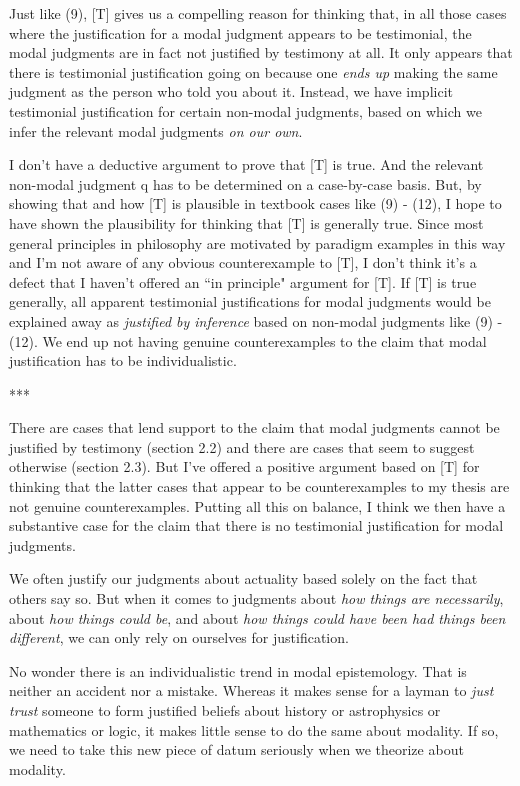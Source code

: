 \documentclass[a4paper,12pt]{article}
\begin{document}
Just like (9), [T] gives us a compelling reason for thinking that, in all those cases where the justification for a modal judgment appears to be testimonial, the modal judgments are in fact not justified by testimony at all. It only appears that there is testimonial justification going on because one \emph{ends up} making the same judgment as the person who told you about it. Instead, we have implicit testimonial justification for certain non-modal judgments, based on which we infer the relevant modal judgments \emph{on our own}.

I don't have a deductive argument to prove that [T] is true. And the relevant non-modal judgment q has to be determined on a case-by-case basis. But, by showing that and how [T] is plausible in textbook cases like (9) - (12), I hope to have shown the plausibility for thinking that [T] is generally true. Since most general principles in philosophy are motivated by paradigm examples in this way and I'm not aware of any obvious counterexample to [T], I don't think it's a defect that I haven't offered an ``in principle" argument for [T]. If [T] is true generally, all apparent testimonial justifications for modal judgments would be explained away as \emph{justified by inference} based on non-modal judgments like (9) - (12). We end up not having genuine counterexamples to the claim that modal justification has to be individualistic.

\begin{center}
***
\end{center}

There are cases that lend support to the claim that modal judgments cannot be justified by testimony (section 2.2) and there are cases that seem to suggest otherwise (section 2.3). But I've offered a positive argument based on [T] for thinking that the latter cases that appear to be counterexamples to my thesis are not genuine counterexamples. Putting all this on balance, I think we then have a substantive case for the claim that there is no testimonial justification for modal judgments.

We often justify our judgments about actuality based solely on the fact that others say so. But when it comes to judgments about \emph{how things are necessarily}, about \emph{how things could be}, and about \emph{how things could have been had things been different}, we can only rely on ourselves for justification.

No wonder there is an individualistic trend in modal epistemology. That is neither an accident nor a mistake. Whereas it makes sense for a layman to \emph{just trust} someone to form justified beliefs about history or astrophysics or mathematics or logic, it makes little sense to do the same about modality. If so, we need to take this new piece of datum seriously when we theorize about modality.
\end{document}
